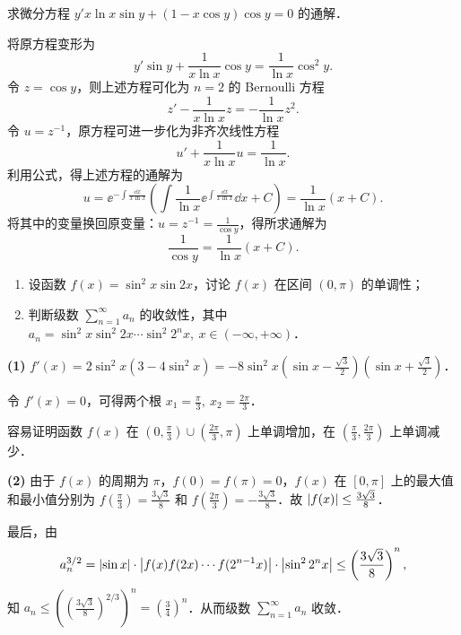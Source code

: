 求微分方程 $y'x\ln x\sin y+(1-x\cos y)\cos y=0$ 的通解．
\begin{solution}
将原方程变形为
\[
y'\sin y+\frac{1}{x\ln x}\cos y=\frac{1}{\ln x}\cos^2 y. \tag{1}
\]
令 $z=\cos y$，则上述方程可化为 $n=2$ 的 Bernoulli 方程
\[
z'-\frac{1}{x\ln x}z=-\frac{1}{\ln x}z^2.
\]
令 $u=z^{-1}$，原方程可进一步化为非齐次线性方程
\[
u'+\frac{1}{x\ln x}u=\frac{1}{\ln x}.
\]
利用公式，得上述方程的通解为
\[
u=\ee^{-\int\frac{\dd x}{x\ln x}}\left(\int\frac{1}{\ln x}\ee^{\int\frac{\dd x}{x\ln x}}\dd x+C\right)=\frac{1}{\ln x}(x+C).
\]
将其中的变量换回原变量：$u=z^{-1}=\frac{1}{\cos y}$，得所求通解为
\[
\frac{1}{\cos y}=\frac{1}{\ln x}(x+C).
\]
\end{solution}

\begin{enumerate}
  \item 设函数 $f(x)=\sin^2 x\sin 2x$，讨论 $f(x)$ 在区间 $(0,\pi)$ 的单调性；
  \item 判断级数 $\displaystyle \sum_{n=1}^{\infty}a_n$ 的收敛性，其中 $a_n=\sin^2 x\sin^2 2x\cdots\sin^2 2^n x,\ x\in(-\infty,+\infty)$．
\end{enumerate}
\begin{solution}
\textbf{(1)} $f'(x)=2\sin^2x\left(3-4\sin^2x\right)=-8\sin^2x\left(\sin x-\frac{\sqrt{3}}{2}\right)\left(\sin x+\frac{\sqrt{3}}{2}\right)$．

令 $f'(x)=0$，可得两个根 $x_1=\frac{\pi}{3},\ x_2=\frac{2\pi}{3}$．

容易证明函数 $f(x)$ 在 $\left(0,\frac{\pi}{3}\right)\cup\left(\frac{2\pi}{3},\pi\right)$ 上单调增加，在 $\left(\frac{\pi}{3},\frac{2\pi}{3}\right)$ 上单调减少．

\textbf{(2)} 由于 $f(x)$ 的周期为 $\pi$，$f(0)=f(\pi)=0$，$f(x)$ 在 $[0,\pi]$ 上的最大值和最小值分别为 $f\left(\frac{\pi}{3}\right)=\frac{3\sqrt{3}}{8}$ 和 $f\left(\frac{2\pi}{3}\right)=-\frac{3\sqrt{3}}{8}$．故 $\left|f(x)\right|\le\frac{3\sqrt{3}}{8}$．

最后，由
\[
a_n^{3/2}=\left|\sin x\right|\cdot\left|f(x)f(2x)\cdots f(2^{n-1}x)\right|\cdot\left|\sin^2 2^n x\right|\le\left(\frac{3\sqrt{3}}{8}\right)^n,
\]
知 $a_n\le\left(\left(\frac{3\sqrt{3}}{8}\right)^{2/3}\right)^n=\left(\frac{3}{4}\right)^n$．从而级数 $\displaystyle \sum_{n=1}^{\infty}a_n$ 收敛．
\end{solution}


